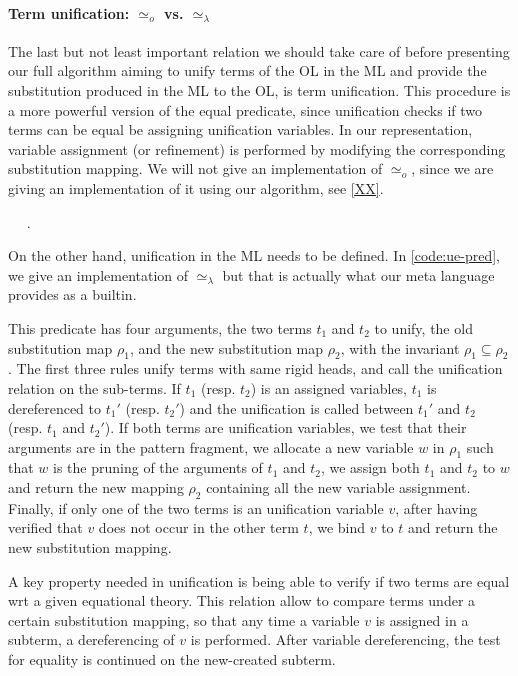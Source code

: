 \documentclass[sigconf,natbib=false,review]{acmart}
\newcommand{\UnifRel}{\ensuremath{\simeq}}
\newcommand{\Uo}{\ensuremath{\UnifRel_o}\xspace}
\newcommand{\Ue}{\ensuremath{\UnifRel_\lambda}\xspace}
\begin{document}
\paragraph{Term unification: \Uo vs. \Ue} 
The last but not least important relation we should take care of before
presenting our full algorithm aiming to unify terms of the OL in the ML and
provide the substitution produced in the ML to the OL, is term unification. This
procedure is a more powerful version of the equal predicate, since unification
checks if two terms can be equal be assigning unification variables. In our
representation, variable assignment (or refinement) is performed by modifying
the corresponding substitution mapping. We will not give an implementation of
\Uo, since we are giving an implementation of it using
our algorithm, see \cref{XX}.

\begin{elpicode}
~ \PYG{n+nf}{(\Ue)} ~.
\end{elpicode}

On the other hand, unification in the ML needs to be defined. In
\cref{code:ue-pred}, we give an implementation of \Ue but
that is actually what our meta language provides as a builtin.

This predicate has four
arguments, the two terms $t_1$ and $t_2$ to unify, the old substitution map
$\rho_1$, and the new substitution map $\rho_2$, with the invariant $\rho_1
\subseteq \rho_2$. The first three rules unify terms with same rigid heads, and
call the unification relation on the sub-terms. If $t_1$ (resp. $t_2$) is an
assigned variables, $t_1$ is dereferenced to $t_1'$ (resp. $t_2'$) and the
unification is called between $t_1'$ and $t_2$ (resp. $t_1$ and $t_2'$). If both
terms are unification variables, we test that their arguments are in the pattern
fragment, we allocate a new variable $w$ in $\rho_1$ such that $w$ is the
pruning of the arguments of $t_1$ and $t_2$, we assign both $t_1$ and $t_2$ to
$w$ and return the new mapping $\rho_2$ containing all the new variable
assignment. Finally, if only one of the two terms is an unification variable
$v$, after having verified that $v$ does not occur in the other term $t$, we
bind $v$ to $t$ and return the new substitution mapping.

\old

A key property needed in unification is being able to verify if two terms are
equal wrt a given equational theory. This relation allow to compare terms under
a certain substitution mapping, so that any time a variable $v$ is assigned in a
subterm, a dereferencing of $v$ is performed. After variable dereferencing, the
test for equality is continued on the new-created subterm.
\end{document}
